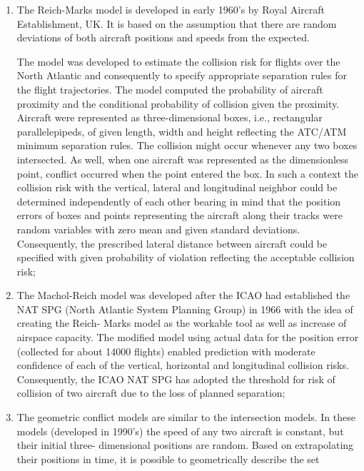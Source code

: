 \documentclass[a4paper, 10pt]{article}
\begin{document}
\begin{enumerate}
		\item The Reich-Marks model is developed in early 1960’s
				by Royal Aircraft Establishment, UK. It is based on the
				assumption that there are random deviations of both aircraft
				positions and speeds from the expected.\par

				The model was developed to estimate the collision risk for
				flights over the North Atlantic and consequently to specify
				appropriate separation rules for the flight trajectories. The
				model computed the probability of aircraft proximity and the
				conditional probability of collision given the proximity.
				Aircraft were represented as three-dimensional boxes, i.e.,
				rectangular parallelepipeds, of given length, width and height
				reflecting the ATC/ATM minimum separation rules. The
				collision might occur whenever any two boxes intersected. As
				well, when one aircraft was represented as the dimensionless
				point, conflict occurred when the point entered the box. In such
				a context the collision risk with the vertical, lateral and
				longitudinal neighbor could be determined independently of
				each other bearing in mind that the position errors of boxes and
				points representing the aircraft along their tracks were random
				variables with zero mean and given standard deviations.
				Consequently, the prescribed lateral distance between aircraft
				could be specified with given probability of violation reflecting
				the acceptable collision risk;
		\item The Machol-Reich model was developed after the
				ICAO had established the NAT SPG (North Atlantic System
				Planning Group) in 1966 with the idea of creating the Reich-
				Marks model as the workable tool as well as increase of
				airspace capacity. The modified model using actual data for the
				position error (collected for about 14000 flights) enabled
				prediction with moderate confidence of each of the vertical,
				horizontal and longitudinal collision risks. Consequently, the
				ICAO NAT SPG has adopted the threshold for risk of collision
				of two aircraft due to the loss of planned separation;
		\item The geometric conflict models are similar to the
				intersection models. In these models (developed in 1990’s) the
				speed of any two aircraft is constant, but their initial three-
				dimensional positions are random. Based on extrapolating their
				positions in time, it is possible to geometrically describe the set

\end{enumerate}
\end{document}
